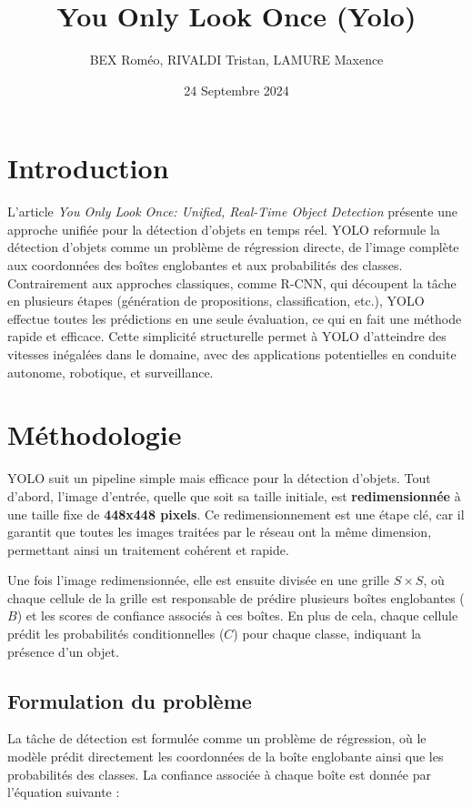 \documentclass[a4paper,11pt]{article}
\title{You Only Look Once (Yolo)}
\author{BEX Roméo, RIVALDI Tristan, LAMURE Maxence}
\date{24 Septembre 2024}
\begin{document}


\newpage

\tableofcontents

\newpage

\section*{Introduction}

L'article \textit{You Only Look Once: Unified, Real-Time Object Detection} présente une approche unifiée pour la détection d'objets en temps réel. YOLO reformule la détection d'objets comme un problème de régression directe, de l'image complète aux coordonnées des boîtes englobantes et aux probabilités des classes. Contrairement aux approches classiques, comme R-CNN, qui découpent la tâche en plusieurs étapes (génération de propositions, classification, etc.), YOLO effectue toutes les prédictions en une seule évaluation, ce qui en fait une méthode rapide et efficace. Cette simplicité structurelle permet à YOLO d'atteindre des vitesses inégalées dans le domaine, avec des applications potentielles en conduite autonome, robotique, et surveillance.

\section{Méthodologie}
YOLO suit un pipeline simple mais efficace pour la détection d'objets. Tout d'abord, l'image d'entrée, quelle que soit sa taille initiale, est \textbf{redimensionnée} à une taille fixe de \textbf{448x448 pixels}. Ce redimensionnement est une étape clé, car il garantit que toutes les images traitées par le réseau ont la même dimension, permettant ainsi un traitement cohérent et rapide.

Une fois l'image redimensionnée, elle est ensuite divisée en une grille $S \times S$, où chaque cellule de la grille est responsable de prédire plusieurs boîtes englobantes ($B$) et les scores de confiance associés à ces boîtes. En plus de cela, chaque cellule prédit les probabilités conditionnelles ($C$) pour chaque classe, indiquant la présence d'un objet.

\subsection{Formulation du problème}
La tâche de détection est formulée comme un problème de régression, où le modèle prédit directement les coordonnées de la boîte englobante ainsi que les probabilités des classes. La confiance associée à chaque boîte est donnée par l'équation suivante :
\end{document}
